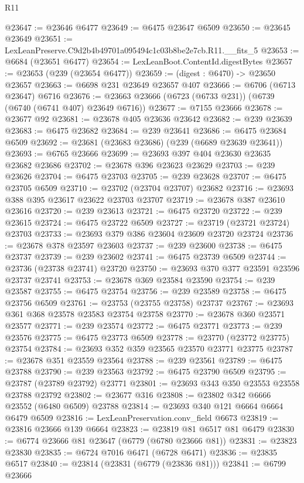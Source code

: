 \begin{lexlean}{R11}
\begin{coremodule}
@23647 := @23646 @6477
@23649 := @6475 @23647 @6509
@23650 := @23645 @23649
@23651 := LexLeanPreserve.C9d2b4b49701a095494c1c03b8be2e7cb.R11.__fits_5
@23653 := @6684 (@23651 @6477)
@23654 := LexLeanBoot.ContentId.digestBytes
@23657 := @23653 (@239 (@23654 @6477))
@23659 := (digest : @6470) -> @23650 @23657
@23663 := @6698 @231 @23649 @23657 @407
@23666 := @6706 (@6713 @23647) @6716
@23676 := @23663 @23666 (@6723 (@6733 @231)) (@6739 (@6740 (@6741 @407) @23649 @6716))
@23677 := @7155 @23666
@23678 := @23677 @92
@23681 := @23678 @405 @23636 @23642
@23682 := @239 @23639
@23683 := @6475 @23682
@23684 := @239 @23641
@23686 := @6475 @23684 @6509
@23692 := @23681 (@23683 @23686) (@239 (@6689 @23639 @23641))
@23693 := @6765 @23666
@23699 := @23693 @397 @404 @23630 @23635 @23682 @23686
@23702 := @23678 @396 @23623 @23629
@23703 := @239 @23626
@23704 := @6475 @23703
@23705 := @239 @23628
@23707 := @6475 @23705 @6509
@23710 := @23702 (@23704 @23707) @23682
@23716 := @23693 @388 @395 @23617 @23622 @23703 @23707
@23719 := @23678 @387 @23610 @23616
@23720 := @239 @23613
@23721 := @6475 @23720
@23722 := @239 @23615
@23724 := @6475 @23722 @6509
@23727 := @23719 (@23721 @23724) @23703
@23733 := @23693 @379 @386 @23604 @23609 @23720 @23724
@23736 := @23678 @378 @23597 @23603
@23737 := @239 @23600
@23738 := @6475 @23737
@23739 := @239 @23602
@23741 := @6475 @23739 @6509
@23744 := @23736 (@23738 @23741) @23720
@23750 := @23693 @370 @377 @23591 @23596 @23737 @23741
@23753 := @23678 @369 @23584 @23590
@23754 := @239 @23587
@23755 := @6475 @23754
@23756 := @239 @23589
@23758 := @6475 @23756 @6509
@23761 := @23753 (@23755 @23758) @23737
@23767 := @23693 @361 @368 @23578 @23583 @23754 @23758
@23770 := @23678 @360 @23571 @23577
@23771 := @239 @23574
@23772 := @6475 @23771
@23773 := @239 @23576
@23775 := @6475 @23773 @6509
@23778 := @23770 (@23772 @23775) @23754
@23784 := @23693 @352 @359 @23565 @23570 @23771 @23775
@23787 := @23678 @351 @23559 @23564
@23788 := @239 @23561
@23789 := @6475 @23788
@23790 := @239 @23563
@23792 := @6475 @23790 @6509
@23795 := @23787 (@23789 @23792) @23771
@23801 := @23693 @343 @350 @23553 @23558 @23788 @23792
@23802 := @23677 @316
@23808 := @23802 @342 @6666 @23552 (@6480 @6509) @23788
@23814 := @23693 @340 @121 @6664 @6664 @6479 @6509
@23816 := LexLeanPreservation.conv_field @6673
@23819 := @23816 @23666 @139 @6664
@23823 := @23819 @81 @6517 @81 @6479
@23830 := @6774 @23666 @81 @23647 (@6779 (@6780 @23666 @81))
@23831 := @23823 @23830
@23835 := @6724 @7016 @6471 (@6728 @6471)
@23836 := @23835 @6517
@23840 := @23814 (@23831 (@6779 (@23836 @81)))
@23841 := @6799 @23666

\end{coremodule}
\end{lexlean}
